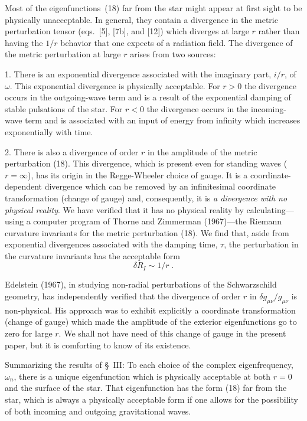 \documentclass[12pt]{article}
\begin{document}
Most of the eigenfunctions~(18) far from the star might appear at first sight to be
physically unacceptable. In general, they contain a divergence in the metric perturbation
tensor (eqs.~[5], [7b], and [12]) which diverges at large $r$ rather than having the $1/r$
behavior that one expects of a radiation field. The divergence of the metric perturbation
at large $r$ arises from two sources:

1. There is an exponential divergence associated with the imaginary part, $i/r$, of $\omega$.
This exponential divergence is physically acceptable. For $r > 0$ the divergence occurs in the outgoing-wave term and is a result of the exponential damping of stable pulsations of the star.
For $r < 0$ the divergence occurs in the incoming-wave term and is associated with an
input of energy from infinity which increases exponentially with time.

2. There is also a divergence of order $r$ in the amplitude of the metric perturbation
(18). This divergence, which is present even for standing waves ($r = \infty$), has its origin
in the Regge-Wheeler choice of gauge. It is a coordinate-dependent divergence which
can be removed by an infinitesimal coordinate transformation (change of gauge) and,
consequently, it is \textit{a divergence with no physical reality}. We have verified that it has no
physical reality by calculating---using a computer program of Thorne and Zimmerman
(1967)---the Riemann curvature invariants for the metric perturbation (18). We find
that, aside from exponential divergences associated with the damping time, $\tau$, the
perturbation in the curvature invariants has the acceptable form
\begin{equation}
  \delta R_I \sim 1/r \;.
\end{equation}

Edelstein (1967), in studying non-radial perturbations of the Schwarzschild geometry,
has independently verified that the divergence of order $r$ in $\delta g_{\mu\nu}/g_{\mu\nu}$ is non-physical. His
approach was to exhibit explicitly a coordinate transformation (change of gauge)
which made the amplitude of the exterior eigenfunctions go to zero for large $r$. We
shall not have need of this change of gauge in the present paper, but it is comforting
to know of its existence.

Summarizing the results of \S~III: To each choice of the complex eigenfrequency,
$\omega_n$, there is a unique eigenfunction which is physically acceptable at both $r = 0$ and
the surface of the star. That eigenfunction has the form (18) far from the star, which
is always a physically acceptable form if one allows for the possibility of both incoming
and outgoing gravitational waves.
\end{document}
